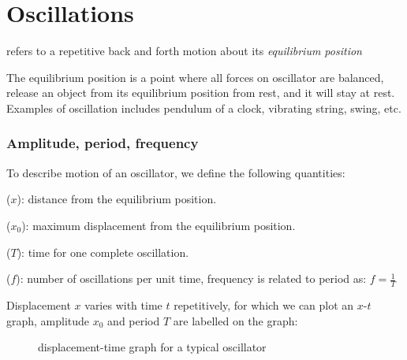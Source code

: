 
\chapter{Oscillations}
\begin{ilight}
	 refers to a repetitive back and forth motion about its \emph{equilibrium position}
\end{ilight}

The equilibrium position is a point where all forces on oscillator are balanced, release an object from its equilibrium position from rest, and it will stay at rest. Examples of oscillation includes pendulum of a clock, vibrating string, swing, etc.

\subsection{Amplitude, period, frequency}

To describe motion of an oscillator, we define the following quantities:

 ($x$): distance from the equilibrium position.

 ($x_0$): maximum displacement from the equilibrium position.

 ($T$): time for one complete oscillation.

 ($f$): number of oscillations per unit time, frequency is related to period as: ${f=\frac{1}{T}}$

\vspace*{\baselineskip}

Displacement $x$ varies with time $t$ repetitively, for which we can plot an $x$-$t$ graph, amplitude $x_0$ and period $T$ are labelled on the graph:


\begin{figure}[ht]
\centering
{}

\caption{displacement-time graph for a typical oscillator}
\end{figure}


